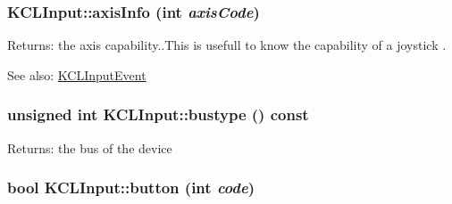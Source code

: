 \hypertarget{class_k_c_l_input_fa50617f76c29a376c615f5420ea3152}{
\subsubsection[{axisInfo}]{ KCLInput::axisInfo (int {\em axisCode})}}
\label{class_k_c_l_input_fa50617f76c29a376c615f5420ea3152}


\begin{Desc}
\item[Returns:]the axis capability..This is usefull to know the capability of a joystick . \end{Desc}
\begin{Desc}
\item[See also:]\hyperlink{class_k_c_l_input_event}{KCLInputEvent} \end{Desc}
\hypertarget{class_k_c_l_input_a10bb61e06d513fdf233a5b674c1d800}{
\subsubsection[{bustype}]{\setlength{\rightskip}{0pt plus 5cm}unsigned int KCLInput::bustype () const}}
\label{class_k_c_l_input_a10bb61e06d513fdf233a5b674c1d800}


\begin{Desc}
\item[Returns:]the bus of the device \end{Desc}
\hypertarget{class_k_c_l_input_afe120b671d76b4b7d14b48e03d4faf6}{
\subsubsection[{button}]{\setlength{\rightskip}{0pt plus 5cm}bool KCLInput::button (int {\em code})}}
\label{class_k_c_l_input_afe120b671d76b4b7d14b48e03d4faf6}


